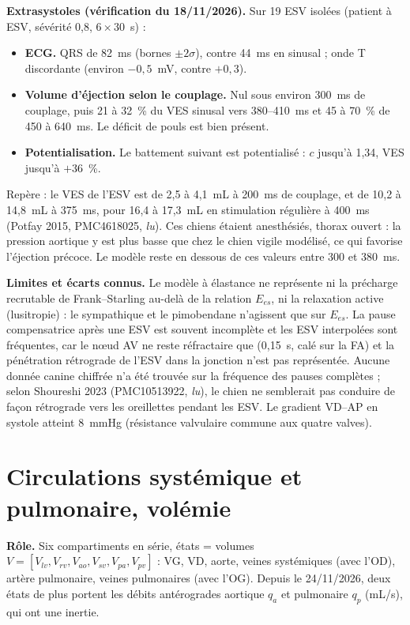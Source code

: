 \documentclass[10pt,a4paper]{article}
\newcommand{\vp}[1]{\text{\texttt{\detokenize{#1}}}}
\newcommand{\acc}[1]{\textsl{#1}}
\newcommand{\limite}[1]{\par\textbf{Limites et écarts connus.} #1}
\begin{document}
\textbf{Extrasystoles (vérification du 18/11/2026).} Sur 19 ESV isolées (patient à ESV, sévérité 0,8, $6 \times 30$~s) :
\begin{itemize}
\item \textbf{ECG.} QRS de 82~ms (bornes $\pm 2\sigma$), contre 44~ms en sinusal ; onde T discordante (environ $-0{,}5$~mV, contre $+0{,}3$).
\item \textbf{Volume d'éjection selon le couplage.} Nul sous environ 300~ms de couplage, puis 21 à 32~\% du VES sinusal vers 380--410~ms et 45 à 70~\% de 450 à 640~ms. Le déficit de pouls est bien présent.
\item \textbf{Potentialisation.} Le battement suivant est potentialisé : $c$ jusqu'à 1,34, VES jusqu'à $+36$~\%.
\end{itemize}
Repère : le VES de l'ESV est de 2,5 à 4,1~mL à 200~ms de couplage, et de 10,2 à 14,8~mL à 375~ms, pour 16,4 à 17,3~mL en stimulation régulière à 400~ms (Potfay 2015, PMC4618025, \acc{lu}). Ces chiens étaient anesthésiés, thorax ouvert : la pression aortique y est plus basse que chez le chien vigile modélisé, ce qui favorise l'éjection précoce. Le modèle reste en dessous de ces valeurs entre 300 et 380~ms.

\limite{Le modèle à élastance ne représente ni la précharge recrutable de Frank--Starling au-delà de la relation $E_{es}$, ni la relaxation active (lusitropie) : le sympathique et le pimobendane n'agissent que sur $E_{es}$. La pause compensatrice après une ESV est souvent incomplète et les ESV interpolées sont fréquentes, car le nœud AV ne reste réfractaire que \vp{av_erp} (0,15~s, calé sur la FA) et la pénétration rétrograde de l'ESV dans la jonction n'est pas représentée. Aucune donnée canine chiffrée n'a été trouvée sur la fréquence des pauses complètes ; selon Shoureshi 2023 (PMC10513922, \acc{lu}), le chien ne semblerait pas conduire de façon rétrograde vers les oreillettes pendant les ESV. Le gradient VD--AP en systole atteint 8~mmHg (résistance valvulaire commune aux quatre valves).}

\section{Circulations systémique et pulmonaire, volémie}\label{sec:circ}

\textbf{Rôle.} Six compartiments en série, états = volumes $V = [V_{lv}, V_{rv}, V_{ao}, V_{sv}, V_{pa}, V_{pv}]$ : VG, VD, aorte, veines systémiques (avec l'OD), artère pulmonaire, veines pulmonaires (avec l'OG). Depuis le 24/11/2026, deux états de plus portent les débits antérogrades aortique $q_a$ et pulmonaire $q_p$ (mL/s), qui ont une inertie.
\end{document}
